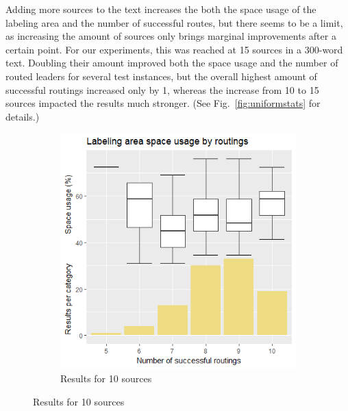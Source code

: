 \documentclass[11pt,a4paper]{vutinfth}
\begin{document}
Adding more sources to the text increases the both the space usage of the labeling area and the number of successful routes, but there seems to be a limit, as increasing the amount of sources only brings marginal improvements after a certain point. For our experiments, this was reached at 15 sources in a 300-word text. Doubling their amount improved both the space usage and the number of routed leaders for several test instances, but the overall highest amount of successful routings increased only by 1, whereas the increase from 10 to 15 sources impacted the results much stronger. (See Fig.~\ref*{fig:uniformstats} for details.)

 \begin{figure}
 	\centering
 	\begin{subfigure}[b]{\textwidth}
 		\centering
 		\includegraphics[scale=0.6]{Rplot_10u.png}
 		\caption{\label{fig:10u}Results for 10 sources}
 	\end{subfigure}
 	

\end{figure}
\end{document}
